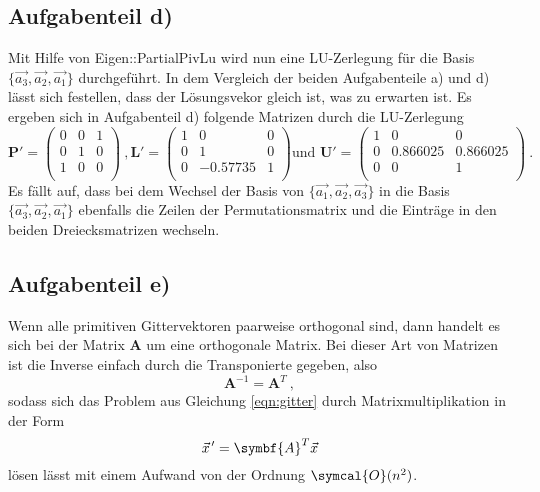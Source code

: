 \subsection*{Aufgabenteil d)}
Mit Hilfe von Eigen::PartialPivLu wird nun eine LU-Zerlegung für die Basis $\{\vec{a_3},\vec{a_2},\vec{a_1}\}$ durchgeführt. In dem Vergleich der beiden Aufgabenteile a) und d) lässt sich festellen, dass der Lösungsvekor gleich ist, was zu erwarten ist.
Es ergeben sich in Aufgabenteil d) folgende Matrizen durch die LU-Zerlegung
\begin{equation*}
  \symbf{P'}=
  \begin{pmatrix}
    0 & 0 & 1 \\
    0 & 1 & 0 \\
    1 & 0 & 0 \\
  \end{pmatrix} \: ,
  \symbf{L'}=
  \begin{pmatrix}
    1 & 0 & 0 \\
    0 & 1 & 0 \\
    0 & -0.57735 & 1 \\
  \end{pmatrix}
  \text{und }
  \symbf{U'}=
  \begin{pmatrix}
    1 & 0 & 0 \\
    0 & 0.866025 & 0.866025 \\
    0 & 0 & 1 \\
  \end{pmatrix} \: .
\end{equation*}
Es fällt auf, dass bei dem Wechsel der Basis von $\{\vec{a_1},\vec{a_2},\vec{a_3}\}$ in die Basis $\{\vec{a_3},\vec{a_2},\vec{a_1}\}$ ebenfalls die Zeilen der Permutationsmatrix und die Einträge in den beiden Dreiecksmatrizen wechseln.

\subsection*{Aufgabenteil e)}

Wenn alle primitiven Gittervektoren paarweise orthogonal sind, dann handelt es sich bei der Matrix $\symbf{A}$  um eine orthogonale Matrix. Bei dieser Art von Matrizen ist die Inverse einfach durch die Transponierte gegeben, also
\begin{equation}
  \symbf{A}^{-1}=\symbf{A}^T \: ,
\end{equation}
sodass sich das Problem aus Gleichung \eqref{eqn:gitter} durch Matrixmultiplikation in der Form
\begin{equation}
  \pvec{x}'=\symbf{A}^T\vec{x}
\end{equation}
lösen lässt mit einem Aufwand von der Ordnung $\symcal{O}(n^2)$.



